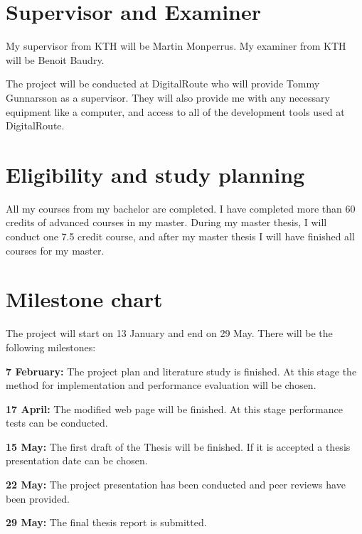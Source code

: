 \section{Supervisor and Examiner}

My supervisor from KTH will be Martin Monperrus. My examiner from KTH will be Benoit Baudry.

The project will be conducted at DigitalRoute who will provide Tommy Gunnarsson as a supervisor. They will also provide me with any necessary equipment like a computer, and access to all of the development tools used at DigitalRoute.

\section{Eligibility and study planning}

All my courses from my bachelor are completed. I have completed more than 60 credits of advanced courses in my master. During my master thesis, I will conduct one 7.5 credit course, and after my master thesis I will have finished all courses for my master.

\section{Milestone chart}

The project will start on 13 January and end on 29 May. There will be the following milestones:

\textbf{7 February:} The project plan and literature study is finished. At this stage the method for implementation and performance evaluation will be chosen.

\textbf{17 April:} The modified web page will be finished. At this stage performance tests can be conducted.

\textbf{15 May:} The first draft of the Thesis will be finished. If it is accepted a thesis presentation date can be chosen.

\textbf{22 May:} The project presentation has been conducted and peer reviews have been provided.

\textbf{29 May:} The final thesis report is submitted.
